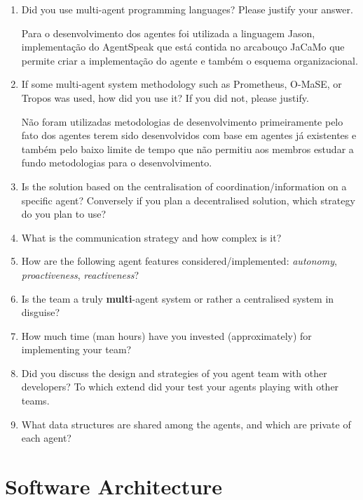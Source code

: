 \documentclass{llncs}
\begin{document}
\begin{enumerate}
 \item Did you use multi-agent programming languages? Please justify your answer.
 
 Para o desenvolvimento dos agentes foi utilizada a linguagem Jason, implementação do AgentSpeak que está contida no arcabouço JaCaMo que permite criar a implementação do agente e também o esquema organizacional.
 
 \item If some multi-agent system methodology such as Prometheus,
   O-MaSE, or Tropos was used, how did you use it? If you did not, please justify.
   
Não foram utilizadas metodologias de desenvolvimento primeiramente pelo fato dos agentes terem sido desenvolvidos com base em agentes já existentes e também pelo baixo limite de tempo que não permitiu aos membros estudar a fundo metodologias para o desenvolvimento.
   
 \item Is the solution based on the centralisation of
   coordination/information on a specific agent? Conversely if you
   plan a decentralised solution, which strategy do you plan to use?
 \item What is the communication strategy and how complex is it?
 \item How are the following agent features considered/implemented:
   \emph{autonomy}, \emph{proactiveness}, \emph{reactiveness}?
 \item Is the team a truly \textbf{multi}-agent system or rather a
   centralised system in disguise?
\item How much time (man hours) have you invested (approximately) for implementing your team?
\item Did you discuss the design and strategies of you agent team with other developers? To which extend did your test your agents playing with other teams.
\item What data structures are shared among the agents, and which are private of each agent?
\end{enumerate}

\section{Software Architecture}
\end{document}
